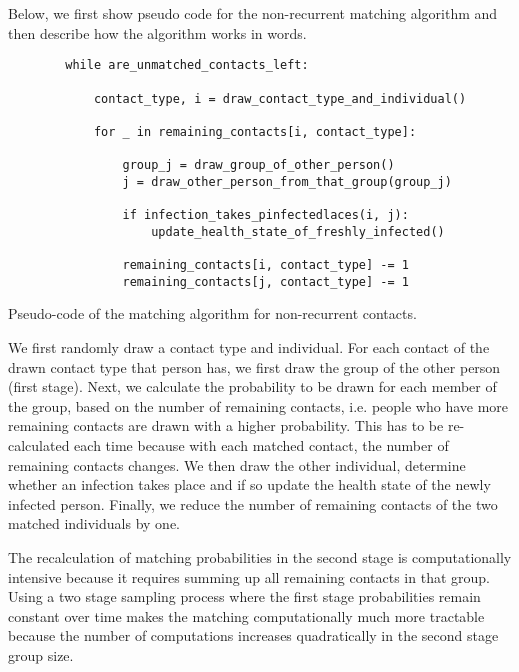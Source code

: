 Below, we first show pseudo code for the non-recurrent matching algorithm and then
describe how the algorithm works in words.

\begin{listing}
    \label{code:matching}
    \begin{verbatim}
        while are_unmatched_contacts_left:

            contact_type, i = draw_contact_type_and_individual()

            for _ in remaining_contacts[i, contact_type]:

                group_j = draw_group_of_other_person()
                j = draw_other_person_from_that_group(group_j)

                if infection_takes_pinfectedlaces(i, j):
                    update_health_state_of_freshly_infected()

                remaining_contacts[i, contact_type] -= 1
                remaining_contacts[j, contact_type] -= 1
    \end{verbatim}
    \caption{Pseudo-code of the matching algorithm for non-recurrent contacts.}
\end{listing}

We first randomly draw a contact type and individual. For each contact of the drawn
contact type that person has, we first draw the group of the other person (first stage).
Next, we calculate the probability to be drawn for each member of the group, based on
the number of remaining contacts, i.e. people who have more remaining contacts are drawn
with a higher probability. This has to be re-calculated each time because with each
matched contact, the number of remaining contacts changes. We then draw the other
individual, determine whether an infection takes place and if so update the health
state of the newly infected person. Finally, we reduce the number of remaining contacts
of the two matched individuals by one.

The recalculation of matching probabilities in the second stage is computationally
intensive because it requires summing up all remaining contacts in that group. Using a
two stage sampling process where the first stage probabilities remain constant over time
makes the matching computationally much more tractable because the number of
computations increases quadratically in the second stage group size.
